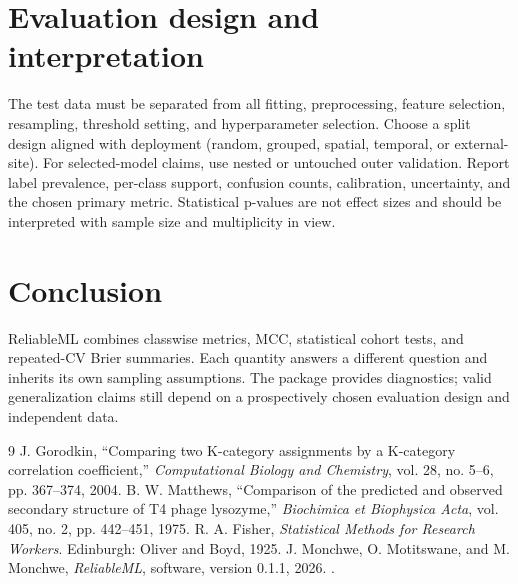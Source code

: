 \documentclass[conference]{IEEEtran}
\begin{document}
\section{Evaluation design and interpretation}
The test data must be separated from all fitting, preprocessing, feature selection, resampling, threshold setting, and hyperparameter selection. Choose a split design aligned with deployment (random, grouped, spatial, temporal, or external-site). For selected-model claims, use nested or untouched outer validation. Report label prevalence, per-class support, confusion counts, calibration, uncertainty, and the chosen primary metric. Statistical p-values are not effect sizes and should be interpreted with sample size and multiplicity in view.

\section{Conclusion}
ReliableML combines classwise metrics, MCC, statistical cohort tests, and repeated-CV Brier summaries. Each quantity answers a different question and inherits its own sampling assumptions. The package provides diagnostics; valid generalization claims still depend on a prospectively chosen evaluation design and independent data.

\begin{thebibliography}{9}
 J. Gorodkin, ``Comparing two K-category assignments by a K-category correlation coefficient,'' \emph{Computational Biology and Chemistry}, vol. 28, no. 5--6, pp. 367--374, 2004.
 B. W. Matthews, ``Comparison of the predicted and observed secondary structure of T4 phage lysozyme,'' \emph{Biochimica et Biophysica Acta}, vol. 405, no. 2, pp. 442--451, 1975.
 R. A. Fisher, \emph{Statistical Methods for Research Workers}. Edinburgh: Oliver and Boyd, 1925.
 J. Monchwe, O. Motitswane, and M. Monchwe, \emph{ReliableML}, software, version 0.1.1, 2026. \projecturl.
\end{thebibliography}
\end{document}

